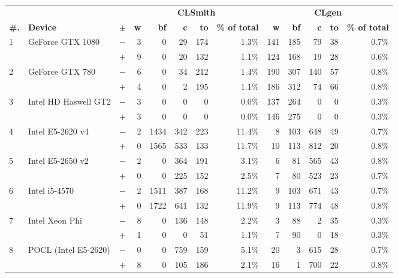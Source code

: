   \begin{tabular}{lll | rrrrr | rrrrr }
  \toprule
  & & & \multicolumn{5}{c|}{\textbf{CLSmith}} & \multicolumn{5}{c}{\textbf{CLgen}} \\
  \textbf{\#.} & \textbf{Device} & $\pm$ &
  \textbf{w} & \textbf{bf} & \textbf{c} & \textbf{to} & \textbf{\% of total} &
  \textbf{w} & \textbf{bf} & \textbf{c} & \textbf{to} & \textbf{\% of total} \\
  \midrule
  \multirow{ 2}{*}{1} & \multirow{ 2}{*}{GeForce GTX 1080} & $-$ & 3 & 0 & 29 & 174 & 1.3\%       & 141 & 185 & 79 & 38 & 0.7\% \\& & $+$ & 9 & 0 & 20 & 132 & 1.1\% & 124 & 168 & 19 & 28 & 0.6\% \\
\hline
\multirow{ 2}{*}{2} & \multirow{ 2}{*}{GeForce GTX 780} & $-$ & 6 & 0 & 34 & 212 & 1.4\%       & 190 & 307 & 140 & 57 & 0.8\% \\& & $+$ & 4 & 0 & 2 & 195 & 1.1\% & 186 & 312 & 74 & 66 & 0.8\% \\
\hline
\multirow{ 2}{*}{3} & \multirow{ 2}{*}{Intel HD Haswell GT2} & $-$ & 3 & 0 & 0 & 0 & 0.0\%       & 137 & 264 & 0 & 0 & 0.3\% \\& & $+$ & 3 & 0 & 0 & 0 & 0.0\% & 146 & 275 & 0 & 0 & 0.3\% \\
\hline
\multirow{ 2}{*}{4} & \multirow{ 2}{*}{Intel E5-2620 v4} & $-$ & 2 & 1434 & 342 & 223 & 11.4\%       & 8 & 103 & 648 & 49 & 0.7\% \\& & $+$ & 0 & 1565 & 533 & 133 & 11.7\% & 10 & 113 & 812 & 20 & 0.8\% \\
\hline
\multirow{ 2}{*}{5} & \multirow{ 2}{*}{Intel E5-2650 v2} & $-$ & 2 & 0 & 364 & 191 & 3.1\%       & 6 & 81 & 565 & 43 & 0.8\% \\& & $+$ & 0 & 0 & 225 & 152 & 2.5\% & 7 & 80 & 523 & 23 & 0.7\% \\
\hline
\multirow{ 2}{*}{6} & \multirow{ 2}{*}{Intel i5-4570} & $-$ & 2 & 1511 & 387 & 168 & 11.2\%       & 9 & 103 & 671 & 43 & 0.7\% \\& & $+$ & 0 & 1722 & 641 & 132 & 11.9\% & 9 & 113 & 774 & 48 & 0.8\% \\
\hline
\multirow{ 2}{*}{7} & \multirow{ 2}{*}{Intel Xeon Phi} & $-$ & 8 & 0 & 136 & 148 & 2.2\%       & 3 & 88 & 2 & 35 & 0.3\% \\& & $+$ & 1 & 0 & 0 & 51 & 1.1\% & 7 & 90 & 0 & 18 & 0.3\% \\
\hline
\multirow{ 2}{*}{8} & \multirow{ 2}{*}{POCL (Intel E5-2620)} & $-$ & 0 & 0 & 759 & 159 & 5.1\%       & 20 & 3 & 615 & 28 & 0.7\% \\& & $+$ & 8 & 0 & 105 & 186 & 2.1\% & 16 & 1 & 700 & 22 & 0.8\% \\

\end{tabular}
